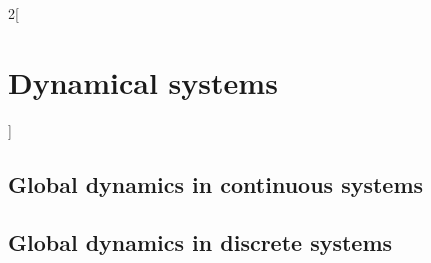 \documentclass[../../../main_math.tex]{subfiles}
\begin{document}
\begin{multicols}{2}[\section{Dynamical systems}]
  \subsection{Global dynamics in continuous systems}
  \subsection{Global dynamics in discrete systems}
\end{multicols}
\end{document}
